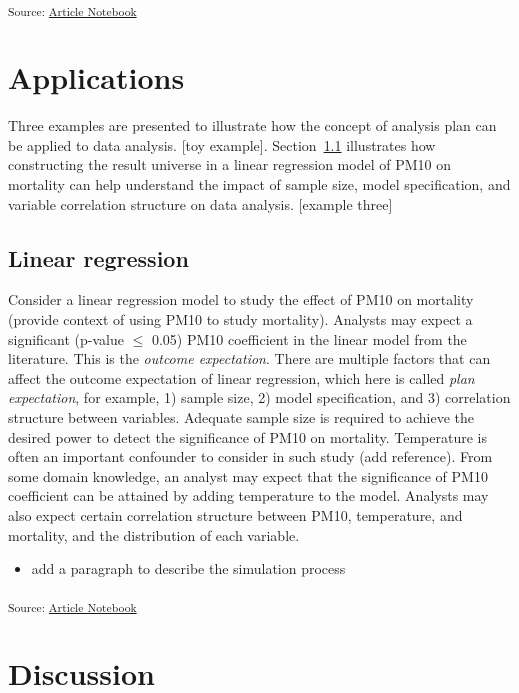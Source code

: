 \documentclass[
]{jds}
\providecommand{\tightlist}{%
  \setlength{\itemsep}{0pt}\setlength{\parskip}{0pt}}\usepackage{longtable,booktabs,array}
\begin{document}
\textsubscript{Source:
\href{https://huizezhang-sherry.github.io/paper-analysis-plan/index.qmd.html}{Article
Notebook}}

\section{Applications}\label{sec-examples}

Three examples are presented to illustrate how the concept of analysis
plan can be applied to data analysis. {[}toy example{]}.
Section~\ref{sec-linear-reg} illustrates how constructing the result
universe in a linear regression model of PM10 on mortality can help
understand the impact of sample size, model specification, and variable
correlation structure on data analysis. {[}example three{]}

\subsection{Linear regression}\label{sec-linear-reg}

Consider a linear regression model to study the effect of PM10 on
mortality (provide context of using PM10 to study mortality). Analysts
may expect a significant (p-value \(\le\) 0.05) PM10 coefficient in the
linear model from the literature. This is the \emph{outcome
expectation}. There are multiple factors that can affect the outcome
expectation of linear regression, which here is called \emph{plan
expectation}, for example, 1) sample size, 2) model specification, and
3) correlation structure between variables. Adequate sample size is
required to achieve the desired power to detect the significance of PM10
on mortality. Temperature is often an important confounder to consider
in such study (add reference). From some domain knowledge, an analyst
may expect that the significance of PM10 coefficient can be attained by
adding temperature to the model. Analysts may also expect certain
correlation structure between PM10, temperature, and mortality, and the
distribution of each variable.

\begin{itemize}
\tightlist
\item
  add a paragraph to describe the simulation process
\end{itemize}

\textsubscript{Source:
\href{https://huizezhang-sherry.github.io/paper-analysis-plan/index.qmd.html}{Article
Notebook}}

\section{Discussion}\label{discussion}
\end{document}
